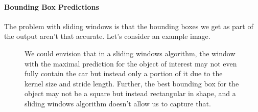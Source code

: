 \documentclass[12pt]{article}
\begin{document}
\paragraph{Bounding Box Predictions}
The problem with sliding windows is that the bounding boxes we get as part of the output aren't that accurate. Let's consider an example image.

\begin{figure}[h]
  \centering
  \caption{\footnotesize We could envision that in a sliding windows algorithm, the window with the maximal prediction for the object of interest may not even fully contain the car but instead only a portion of it due to the kernel size and stride length. Further, the best bounding box for the object may not be a square but instead rectangular in shape, and a sliding windows algorithm doesn't allow us to capture that.}
\end{figure}
\end{document}
